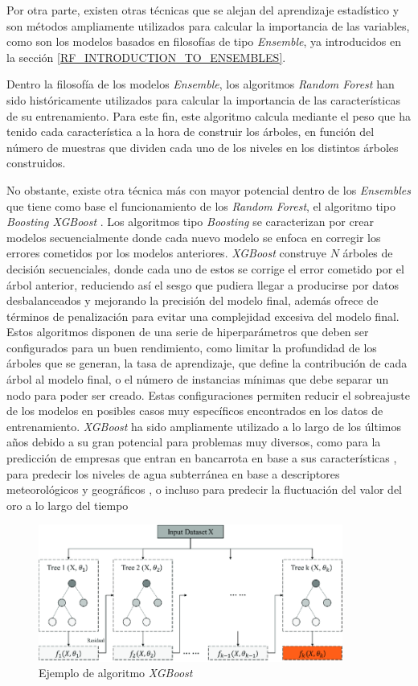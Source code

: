 Por otra parte, existen otras técnicas que se alejan del aprendizaje estadístico y son métodos ampliamente utilizados para calcular la importancia de las variables, como son los modelos basados en filosofías de tipo \textit{Ensemble}, ya introducidos en la sección \ref{RF_INTRODUCTION_TO_ENSEMBLES}.

Dentro la filosofía de los modelos \textit{Ensemble}, los algoritmos \textit{Random Forest} han sido históricamente utilizados para calcular la importancia de las características de su entrenamiento. Para este fin, este algoritmo calcula mediante el peso que ha tenido cada característica a la hora de construir los árboles, en función del número de muestras que dividen cada uno de los niveles en los distintos árboles construidos.

No obstante, existe otra técnica más con mayor potencial dentro de los \textit{Ensembles} que tiene como base el funcionamiento de los \textit{Random Forest}, el algoritmo tipo \textit{Boosting XGBoost} \cite{Chen_2016}. Los algoritmos tipo \textit{Boosting} se caracterizan por crear modelos secuencialmente donde cada nuevo modelo se enfoca en corregir los errores cometidos por los modelos anteriores. \textit{XGBoost} construye $N$ árboles de decisión secuenciales, donde cada uno de estos se corrige el error cometido por el árbol anterior, reduciendo así el sesgo que pudiera llegar a producirse por datos desbalanceados y mejorando la precisión del modelo final, además ofrece de términos de penalización para evitar una complejidad excesiva del modelo final. Estos algoritmos disponen de una serie de hiperparámetros que deben ser configurados para un buen rendimiento, como limitar la profundidad de los árboles que se generan, la tasa de aprendizaje, que define la contribución de cada árbol al modelo final, o el número de instancias mínimas que debe separar un nodo para poder ser creado. Estas configuraciones permiten reducir el sobreajuste de los modelos en posibles casos muy específicos encontrados en los datos de entrenamiento. \textit{XGBoost} ha sido ampliamente utilizado a lo largo de los últimos años debido a su gran potencial para problemas muy diversos, como para la predicción de empresas que entran en bancarrota en base a sus características \cite{BenJabeur2023}, para predecir los niveles de agua subterránea en base a descriptores meteorológicos y geográficos \cite{IBRAHEMAHMEDOSMAN20211545}, o incluso para predecir la fluctuación del valor del oro a lo largo del tiempo \cite{Jabeur2021}

\begin{figure}[H]
	\centering
	\includegraphics[width=10cm]{Figures/Background/XGBoost-model-process.png}
	\caption{Ejemplo de algoritmo \textit{XGBoost} \cite{XGBOOST_IMAGE}}
	\label{XGBOOST_BACKGROUND}
\end{figure}



